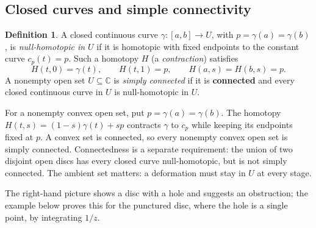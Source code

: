 \documentclass[11pt]{article}
\theoremstyle{plain}
\theoremstyle{definition}
\newtheorem{definition}[theorem]{Definition}
\theoremstyle{remark}
\numberwithin{equation}{section}
\newcommand{\C}{\mathbb{C}}
\begin{document}
\subsection{Closed curves and simple connectivity}
\begin{definition}
A closed continuous curve $\gamma\colon[a,b]\to U$, with
$p=\gamma(a)=\gamma(b)$, is \emph{null-homotopic in $U$} if it
is homotopic with fixed endpoints to the constant curve $c_p(t)=p$.
Such a homotopy $H$ (a \emph{contraction}) satisfies
\[
 H(t,0)=\gamma(t),\qquad H(t,1)=p,\qquad H(a,s)=H(b,s)=p.
\]
A nonempty open set $U\subseteq\C$ is \emph{simply connected} if
it is \textbf{connected} and every closed continuous curve in $U$
is null-homotopic in $U$.
\end{definition}
For a nonempty convex open set, put $p=\gamma(a)=\gamma(b)$. The homotopy
$H(t,s)=(1-s)\gamma(t)+sp$ contracts $\gamma$ to $c_p$ while
keeping its endpoints fixed at $p$. A convex set is connected, so every
nonempty convex open set is simply connected.
Connectedness is a separate requirement: the union of two disjoint open
discs has every closed curve null-homotopic, but is not simply connected.
The ambient set matters: a deformation must stay in $U$ at every stage.

\begin{center}
\end{center}
The right-hand picture shows a disc with a hole and suggests an
obstruction; the example below proves this for the punctured disc, where
the hole is a single point, by integrating $1/z$.
\end{document}

